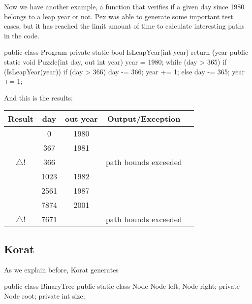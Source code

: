 \documentclass[citeauthoryear]{llncs}
\newcommand{\checkK}{\color{ForestGreen}\checkmark}
\newcommand{\bigexclaim}{\color{Dandelion}$\bigtriangleup$\hspace{-5.6pt}!}
\begin{document}
Now we have another example, a function that verifies if a given day since 1980 belongs to a leap year or not. Pex was able to generate
some important test cases, but it has reached the limit amount of time to calculate interesting paths in the code.

\begin{code}
public class Program {
  private static bool IsLeapYear(int year) {
    return (year %
  }
  public static void Puzzle(int day, out int year) {
    year = 1980;
    while (day > 365) {
      if (IsLeapYear(year)) {
        if (day > 366) {
          day -= 366;
          year += 1;
        }
      } else {
        day -= 365;
        year += 1;
      }
    }
  }
}
\end{code}

And this is the results:\\

\noindent \begin{tabular}{|c|c|c|c|c|}\hline
Result & day & out year & Output/Exception\\\hline
\checkK & 0 & 1980 & \\\hline
\checkK & 367 & 1981 & \\\hline
\bigexclaim & 366 & & path bounds exceeded\\\hline
\checkK & 1023 & 1982 &\\\hline
\checkK & 2561 & 1987 & \\\hline
\checkK & 7874 & 2001 & \\\hline
\bigexclaim &  7671 & & path bounds exceeded\\\hline
\end{tabular}

\subsection{Korat}
As we explain before, Korat generates 

\begin{code}
public class BinaryTree {
  public static class Node {
    Node left;
    Node right;
  }
  private Node root;
  private int size;
}
\end{code}



\end{document}
